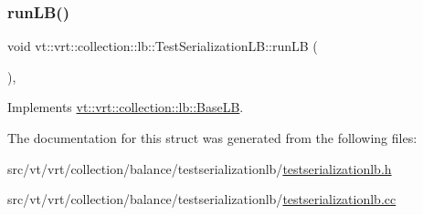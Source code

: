 \subsubsection{\texorpdfstring{run\+L\+B()}{runLB()}}
{\footnotesize\ttfamily void vt\+::vrt\+::collection\+::lb\+::\+Test\+Serialization\+L\+B\+::run\+LB (\begin{DoxyParamCaption}\item[{\hyperlink{namespacevt_a8fb51741340b87d7aaee0bef60e9896b}{Load\+Type}}]{ }\end{DoxyParamCaption})\hspace{0.3cm}{\ttfamily [override]}, {\ttfamily [virtual]}}



Implements \hyperlink{structvt_1_1vrt_1_1collection_1_1lb_1_1_base_l_b_aa957038bb132ac29fb61535487f0604f}{vt\+::vrt\+::collection\+::lb\+::\+Base\+LB}.



The documentation for this struct was generated from the following files\+:\begin{DoxyCompactItemize}
\item 
src/vt/vrt/collection/balance/testserializationlb/\hyperlink{testserializationlb_8h}{testserializationlb.\+h}\item 
src/vt/vrt/collection/balance/testserializationlb/\hyperlink{testserializationlb_8cc}{testserializationlb.\+cc}\end{DoxyCompactItemize}
